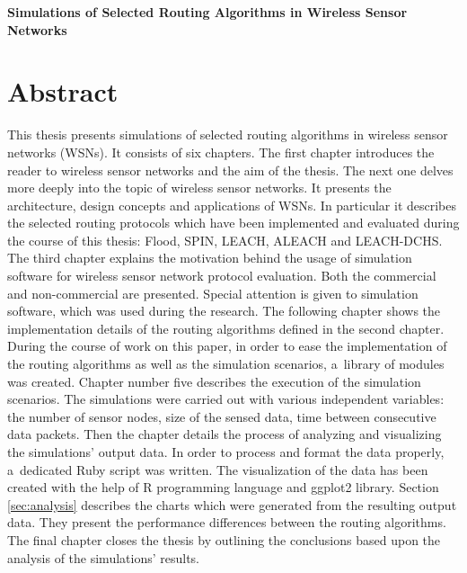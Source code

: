 \vskip 2cm


\begin{center}
\large \bf
Simulations of Selected Routing Algorithms in Wireless Sensor Networks
\end{center}

\section*{Abstract}
This thesis presents simulations of selected routing algorithms in wireless sensor networks (WSNs). It consists of six chapters. The first chapter introduces the reader to wireless sensor networks and the aim of the thesis. The next one delves more deeply into the topic of wireless sensor networks. It presents the architecture, design concepts and applications of WSNs. In particular it describes the selected routing protocols which have been implemented and evaluated during the course of this thesis: Flood, SPIN, LEACH, ALEACH and LEACH-DCHS. The third chapter explains the motivation behind the usage of simulation software for wireless sensor network protocol evaluation. Both the commercial and non-commercial are presented. Special attention is given to \omnetpp simulation software, which was used during the research. The following chapter shows the implementation details of the routing algorithms defined in the second chapter. During the course of work on this paper, in order to ease the implementation of the routing algorithms as well as the simulation scenarios, a~library of \omnetpp modules was created. Chapter number five describes the execution of the simulation scenarios. The simulations were carried out with various independent variables: the number of sensor nodes, size of the sensed data, time between consecutive data packets. Then the chapter details the process of analyzing and visualizing the simulations' output data. In order to process and format the data properly, a~dedicated Ruby script was written. The visualization of the data has been created with the help of R programming language and ggplot2 library. Section \ref{sec:analysis} describes the charts which were generated from the resulting output data. They present the performance differences between the routing algorithms. The final chapter closes the thesis by outlining the conclusions based upon the analysis of the simulations' results.    

\vfill